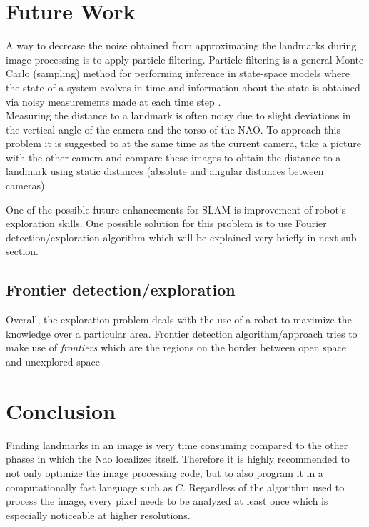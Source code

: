 \documentclass{ba-kecs}
\numberwithin{figure}{section}
\numberwithin{equation}{section}
\begin{document}

\section{Future Work}
	A way to decrease the noise obtained from approximating the landmarks during image processing is to apply particle filtering. Particle filtering is a general Monte Carlo (sampling) method for performing inference in
state-space models where the state of a system evolves in time and information about the state is obtained via noisy measurements made at each time step \cite{ParFil}. \\

	Measuring the distance to a landmark is often noisy due to slight deviations in the vertical angle of the camera and the torso of the NAO. To approach this problem it is suggested to at the same time as the current camera, take a picture with the other camera and compare these images to obtain the distance to a landmark using static distances (absolute and angular distances between cameras).
	
	One of the possible future enhancements for SLAM is improvement of robot`s exploration skills. One possible solution for this problem is to use Fourier detection/exploration algorithm which will be explained very briefly in next sub-section.
	
\subsection{Frontier detection/exploration}
	Overall, the exploration problem deals with the use of a robot to maximize the knowledge over a particular area. Frontier detection algorithm/approach tries to make use of \textit{frontiers} which are the regions on the border between open space and unexplored space \cite{frontier}


\section{Conclusion}

Finding landmarks in an image is very time consuming compared to the other phases in which the Nao localizes itself. Therefore it is highly recommended to not only optimize the image processing code, but to also program it in a computationally fast language such as $\textit{C}$. Regardless of the algorithm used to process the image, every pixel needs to be analyzed at least once which is especially noticeable at higher resolutions. \\
\end{document}
